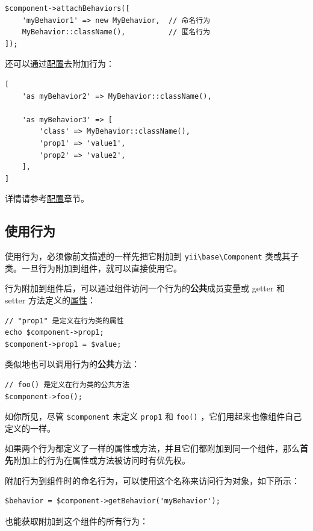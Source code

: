\lstset{language=php}\begin{lstlisting}
$component->attachBehaviors([
    'myBehavior1' => new MyBehavior,  // 命名行为
    MyBehavior::className(),          // 匿名行为
]);
\end{lstlisting}
还可以通过\hyperref[concept-configurations.md]{配置}去附加行为：

\lstset{language=php}\begin{lstlisting}
[
    'as myBehavior2' => MyBehavior::className(),

    'as myBehavior3' => [
        'class' => MyBehavior::className(),
        'prop1' => 'value1',
        'prop2' => 'value2',
    ],
]
\end{lstlisting}
详情请参考\hyperref[concept-configurations.md::configuration-format]{配置}章节。

\subsection{使用行为}
使用行为，必须像前文描述的一样先把它附加到 \texttt{yii{\allowbreak{}\textbackslash}base{\allowbreak{}\textbackslash}Component} 类或其子类。一旦行为附加到组件，就可以直接使用它。

行为附加到组件后，可以通过组件访问一个行为的\textbf{公共}成员变量或 getter 和 setter 方法定义的\hyperref[concept-properties.md]{属性}：

\lstset{language=php}\begin{lstlisting}
// "prop1" 是定义在行为类的属性
echo $component->prop1;
$component->prop1 = $value;
\end{lstlisting}
类似地也可以调用行为的\textbf{公共}方法：

\lstset{language=php}\begin{lstlisting}
// foo() 是定义在行为类的公共方法
$component->foo();
\end{lstlisting}
如你所见，尽管 \lstinline|$component| 未定义 \lstinline|prop1| 和 \lstinline|foo()| ，它们用起来也像组件自己定义的一样。

如果两个行为都定义了一样的属性或方法，并且它们都附加到同一个组件，那么\textbf{首先}附加上的行为在属性或方法被访问时有优先权。

附加行为到组件时的命名行为，可以使用这个名称来访问行为对象，如下所示：

\lstset{language=php}\begin{lstlisting}
$behavior = $component->getBehavior('myBehavior');
\end{lstlisting}
也能获取附加到这个组件的所有行为：

